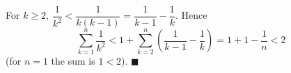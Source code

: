 For $k\ge2$, $\dfrac1{k^2}<\dfrac1{k(k-1)}=\dfrac1{k-1}-\dfrac1k$. Hence
\[\sum_{k=1}^{n}\dfrac1{k^2}<1+\sum_{k=2}^{n}\left(\dfrac1{k-1}-\dfrac1k\right)=1+1-\dfrac1n<2\]
(for $n=1$ the sum is $1<2$). $\blacksquare$
